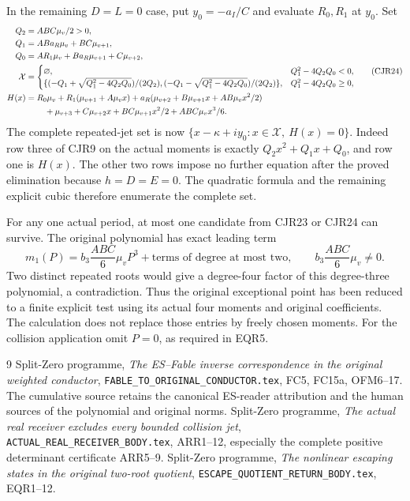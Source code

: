 \documentclass[11pt]{article}
\begin{document}
In the remaining $D=L=0$ case, put $y_0=-a_I/C$ and evaluate
$R_0,R_1$ at $y_0$. Set
\[
\begin{split}
 Q_2&=ABC\mu_v/2>0,\\
 Q_1&=ABa_R\mu_v+BC\mu_{v+1},\\
 Q_0&=AR_1\mu_v+Ba_R\mu_{v+1}+C\mu_{v+2},\\
 \mathcal X&=\begin{cases}
 \varnothing,&Q_1^2-4Q_2Q_0<0,\\
 \{(-Q_1+\sqrt{Q_1^2-4Q_2Q_0})/(2Q_2),
   (-Q_1-\sqrt{Q_1^2-4Q_2Q_0})/(2Q_2)\},&Q_1^2-4Q_2Q_0\ge0,
 \end{cases}\\
 H(x)&=R_0\mu_v+R_1(\mu_{v+1}+A\mu_vx)
       +a_R(\mu_{v+2}+B\mu_{v+1}x+AB\mu_vx^2/2)\\
 &\hspace{8mm}+\mu_{v+3}+C\mu_{v+2}x+
                 BC\mu_{v+1}x^2/2+ABC\mu_vx^3/6.
\end{split}\tag{CJR24}
\]
The complete repeated-jet set is now
$\{x-\kappa+iy_0:x\in\mathcal X,\ H(x)=0\}$.
Indeed row three of CJR9 on the actual moments is exactly
$Q_2x^2+Q_1x+Q_0$, and row one is $H(x)$.
The other two rows impose no further equation after the proved
elimination because $h=D=E=0$. The quadratic formula and the
remaining explicit cubic therefore enumerate the complete set.

For any one actual period, at most one candidate from CJR23 or
CJR24 can survive. The original polynomial has exact leading term
\[
 m_1(P)=b_3\frac{ABC}{6}\mu_vP^3+
                         \text{terms of degree at most two},
 \qquad b_3\frac{ABC}{6}\mu_v\ne0.
 \tag{CJR25}
\]
Two distinct repeated roots would give a degree-four factor of
this degree-three polynomial, a contradiction. Thus the original
exceptional point has been reduced to a finite explicit test using
its actual four moments and original coefficients. The calculation
does not replace those entries by freely chosen moments. For the
collision application omit $P=0$, as required in EQR5.

\begin{thebibliography}{9}
 Split-Zero programme, \emph{The ES--Fable inverse
correspondence in the original weighted conductor},
\texttt{FABLE\_TO\_ORIGINAL\_CONDUCTOR.tex}, FC5, FC15a, OFM6--17.
The cumulative source retains the canonical ES-reader attribution
and the human sources of the polynomial and original norms.
 Split-Zero programme, \emph{The actual real receiver
excludes every bounded collision jet},
\texttt{ACTUAL\_REAL\_RECEIVER\_BODY.tex}, ARR1--12,
especially the complete positive determinant certificate ARR5--9.
 Split-Zero programme, \emph{The nonlinear escaping
states in the original two-root quotient},
\texttt{ESCAPE\_QUOTIENT\_RETURN\_BODY.tex}, EQR1--12.
\end{thebibliography}
\end{document}
